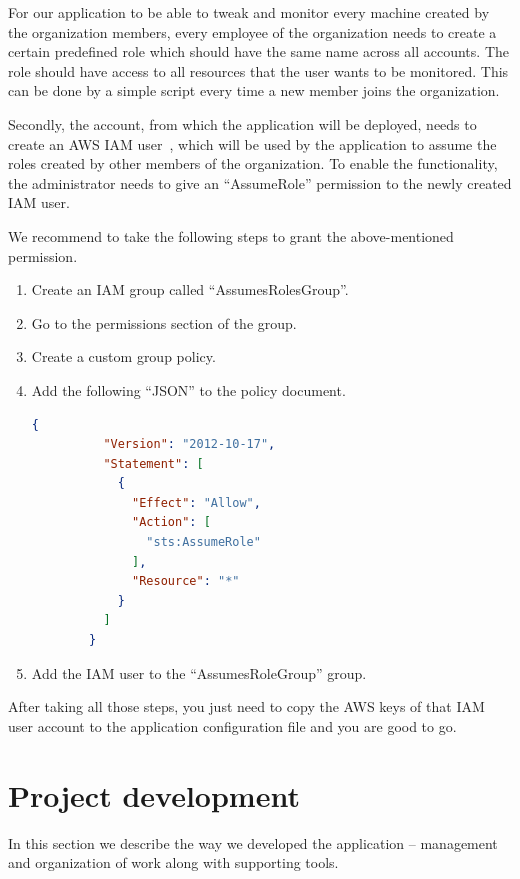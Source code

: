 \documentclass[licencjacka,en]{thesisclass}
\begin{document}
    For our application to be able to tweak and monitor every machine
    created by the organization members, every employee of the organization
    needs to create a certain predefined role
    which should have the same name across all accounts.
    The role should have access to all resources that the user wants to be monitored.
    This can be done by a simple script every time a new member joins the organization.

    Secondly, the account, from which the application will be deployed,
    needs to create an AWS IAM user~\cite{AWSIAM},
    which will be used by the application to assume
    the roles created by other members of the organization.
    To enable the functionality, the administrator needs
    to give an “AssumeRole” permission to the newly created IAM user.

    We recommend to take the following steps to grant the above-mentioned permission.


    \begin{enumerate}
        \item Create an IAM group called “AssumesRolesGroup”.
        \item Go to the permissions section of the group.
        \item Create a custom group policy.
        \item Add the following “JSON” to the policy document.

        \begin{lstlisting}[language=json,firstnumber=1]
        {
          "Version": "2012-10-17",
          "Statement": [
            {
              "Effect": "Allow",
              "Action": [
                "sts:AssumeRole"
              ],
              "Resource": "*"
            }
          ]
        }
        \end{lstlisting}

        \item Add the IAM user to the “AssumesRoleGroup” group.
    \end{enumerate}

    After taking all those steps, you just need to copy
    the AWS keys of that IAM user account
    to the application configuration file and you are good to go.


    \chapter{Project development}

    In this section we describe the way we developed
    the application -- management and organization of work along with supporting tools.
\end{document}
